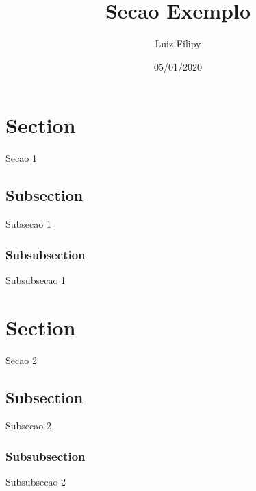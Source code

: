 \documentclass{article}
\title{Secao Exemplo}
\date{05/01/2020}
\author{Luiz Filipy}
\begin{document}
  \maketitle
  \newpage

  \doublespacing
  \tableofcontents
  \newpage

  \section{Section}
  Secao 1

  \subsection{Subsection}
  Subsecao 1

  \subsubsection{Subsubsection}
  Subsubsecao 1

  \newpage
  \section{Section}
  Secao 2

  \subsection{Subsection}
  Subsecao 2

  \subsubsection{Subsubsection}
  Subsubsecao 2
\end{document}
